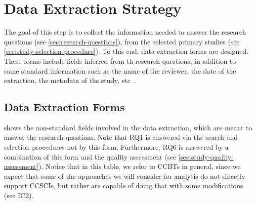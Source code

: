 \documentclass[review]{elsarticle}
\begin{document}
\section{Data Extraction Strategy}
\label{sec:data-extraction-strategy}
The goal of this step is to collect the information needed to answer the research questions (see \cref{sec:research-questions}), from the selected primary studies (see \cref{sec:study-selection-procedure}).
To this end, data extraction forms are designed.
These forms include fields inferred from th research questions, in addition to some standard information such as the name of the reviewer, the date of the extraction, the metadata of the study, etc~\cite{Kitchenham2007SLR}.

\subsection{Data Extraction Forms}
 shows the non-standard fields involved in the data extraction, which are meant to answer the research questions.
Note that RQ1 is answered via the search and selection procedures not by this form.
Furthermore, RQ6 is answered by a combination of this form and the quality assessment (see \cref{sec:study-quality-assessment}).
Notice that in this table, we refer to CCBTs in general, since we expect that some of the approaches we will consider for analysis do not directly support CCSCIs, but rather are capable of doing that with some modifications (see IC2).
\end{document}
